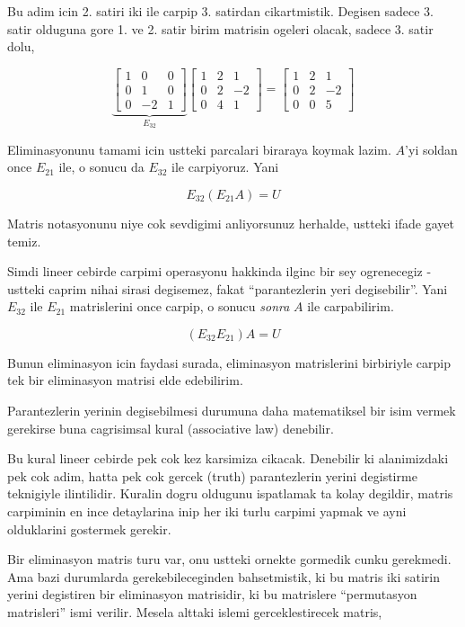 \documentclass[12pt,fleqn]{article}\usepackage{../common}
\begin{document}
Bu adim icin 2. satiri iki ile carpip 3. satirdan cikartmistik. Degisen
sadece 3. satir olduguna gore 1. ve 2. satir birim matrisin ogeleri olacak,
sadece 3. satir dolu,

$$ 
\underbrace{
\left[\begin{array}{rrr}
1 & 0 & 0 \\
0 & 1 & 0 \\
0 & -2 & 1
\end{array}\right]
}_{E_{32} }
\left[\begin{array}{rrr}
  1 & 2 & 1 \\
  0 & 2 & -2 \\
  0 & 4 & 1
\end{array}\right] 
=
\left[\begin{array}{rrr}
1 & 2 & 1 \\
0 & 2 & -2 \\
0 & 0 & 5
\end{array}\right]
 $$

Eliminasyonunu tamami icin ustteki parcalari biraraya koymak
lazim. $A$'yi soldan once $E_{21}$ ile, o sonucu da $E_{32}$ ile
carpiyoruz. Yani

$$ E_{32} (E_{21}A) = U $$

Matris notasyonunu niye cok sevdigimi anliyorsunuz herhalde, ustteki ifade
gayet temiz. 

Simdi lineer cebirde carpimi operasyonu hakkinda ilginc bir sey ogrenecegiz
- ustteki caprim nihai sirasi degisemez, fakat ``parantezlerin yeri
degisebilir''. Yani $E_{32}$ ile $E_{21}$ matrislerini once carpip, o
sonucu {\em sonra} $A$ ile carpabilirim. 

$$ (E_{32} E_{21}) A = U $$

Bunun eliminasyon icin faydasi surada, eliminasyon matrislerini birbiriyle
carpip tek bir eliminasyon matrisi elde edebilirim. 

Parantezlerin yerinin degisebilmesi durumuna daha matematiksel bir isim
vermek gerekirse buna cagrisimsal kural (associative law) denebilir. 

Bu kural lineer cebirde pek cok kez karsimiza cikacak. Denebilir ki
alanimizdaki pek cok adim, hatta pek cok gercek (truth) parantezlerin
yerini degistirme teknigiyle ilintilidir. Kuralin dogru oldugunu ispatlamak
ta kolay degildir, matris carpiminin en ince detaylarina inip her iki turlu
carpimi yapmak ve ayni olduklarini gostermek gerekir. 

Bir eliminasyon matris turu var, onu ustteki ornekte gormedik cunku
gerekmedi. Ama bazi durumlarda gerekebileceginden bahsetmistik, ki bu
matris iki satirin yerini degistiren bir eliminasyon matrisidir, ki bu
matrislere ``permutasyon matrisleri'' ismi verilir. Mesela alttaki islemi
gerceklestirecek matris,
\end{document}
